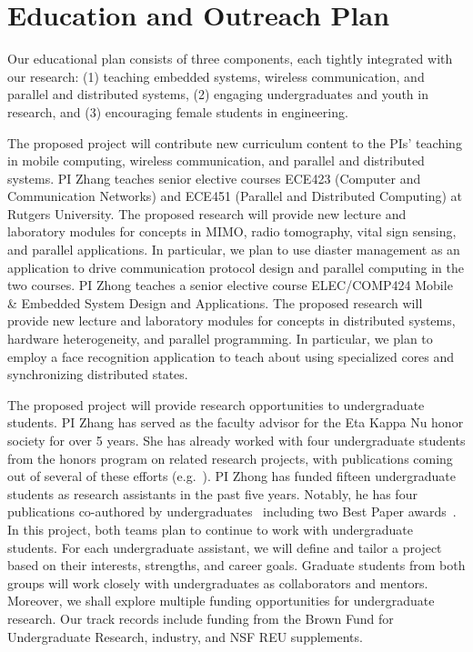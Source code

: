 \section{Education and Outreach Plan\label{sec:education}}
Our educational plan consists of three components, each tightly integrated with our research: (1) teaching embedded systems, wireless communication, and parallel and distributed systems, (2) engaging undergraduates and youth in research, and (3) encouraging female students in engineering.

The proposed project will contribute new curriculum content to the PIs' teaching in mobile computing, wireless communication, and parallel and distributed systems.  PI Zhang teaches senior elective courses ECE423 (Computer and Communication Networks) and ECE451 (Parallel and Distributed Computing) at Rutgers University. The proposed research will provide new lecture and laboratory modules for concepts in MIMO, radio tomography, vital sign sensing, and parallel applications. In particular, we plan to use diaster management as an application to drive communication protocol design and parallel computing in the two courses.  PI Zhong teaches a senior elective course ELEC/COMP424 Mobile \& Embedded System Design and Applications. The proposed research will provide new lecture and laboratory modules for concepts in distributed systems, hardware heterogeneity, and parallel programming. In particular, we plan to employ a face recognition application to teach about using specialized cores and synchronizing distributed states.


The proposed project will provide research opportunities to undergraduate students. PI Zhang has served as the faculty advisor for the Eta Kappa
Nu honor society for over 5 years. She has already worked with four undergraduate students from the honors program on related research projects, with publications coming out of several of these efforts (e.g.~\cite{jsspp03,sensorfusion05,xu:wise04,xu:mobihoc05}). PI Zhong has funded fifteen undergraduate students as research assistants in the past five years. Notably, he has four publications co-authored by undergraduates~\cite{rahmati2007mobilehci,liu2009percom,dong2009dac,dong2009islped} including two Best Paper awards~\cite{rahmati2007mobilehci,liu2009percom}. In this project, both teams plan to continue to work with undergraduate students. For each undergraduate assistant, we will define and tailor a project based on their interests, strengths, and career goals. Graduate students from both groups will work closely with undergraduates as collaborators and mentors. Moreover, we shall explore multiple funding opportunities for undergraduate research. Our track records include funding from the Brown Fund for Undergraduate Research, industry, and NSF REU supplements.

